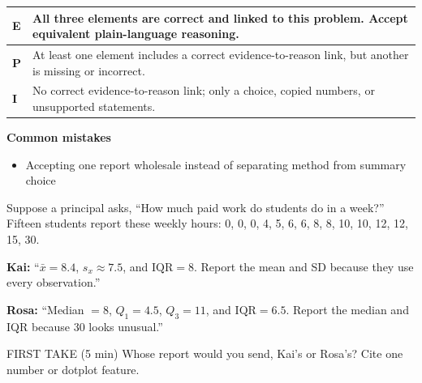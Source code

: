 \documentclass[11pt]{article}
\begin{document}
{\small\renewcommand{\arraystretch}{1.25}
\noindent\begin{tabular}{|p{0.5in}|p{5.9in}|}
\hline
\textbf{E} & All three elements are correct and linked to this problem. Accept equivalent plain-language reasoning. \\ \hline
\textbf{P} & At least one element includes a correct evidence-to-reason link, but another is missing or incorrect. \\ \hline
\textbf{I} & No correct evidence-to-reason link; only a choice, copied numbers, or unsupported statements. \\ \hline
\end{tabular}}

\textbf{Common mistakes}
\begin{itemize}[leftmargin=1.5em,itemsep=2pt,topsep=2pt]
  \item Accepting one report wholesale instead of separating method from summary choice
\end{itemize}

\clearpage
{}

Suppose a principal asks, ``How much paid work do students do in a week?'' Fifteen students report these weekly hours: 0, 0, 0, 4, 5, 6, 6, 8, 8, 10, 10, 12, 12, 15, 30.\par\smallskip \textbf{Kai:} ``$\bar{x}=8.4$, $s_x\approx7.5$, and $\mathrm{IQR}=8$. Report the mean and SD because they use every observation.''\par \textbf{Rosa:} ``Median $=8$, $Q_1=4.5$, $Q_3=11$, and $\mathrm{IQR}=6.5$. Report the median and IQR because 30 looks unusual.''\par
\begin{center}
\end{center}
\begin{firsttakebox}{FIRST TAKE (5 min)}
Whose report would you send, Kai's or Rosa's? Cite one number or dotplot feature.\par
{}
\end{firsttakebox}
\end{document}
